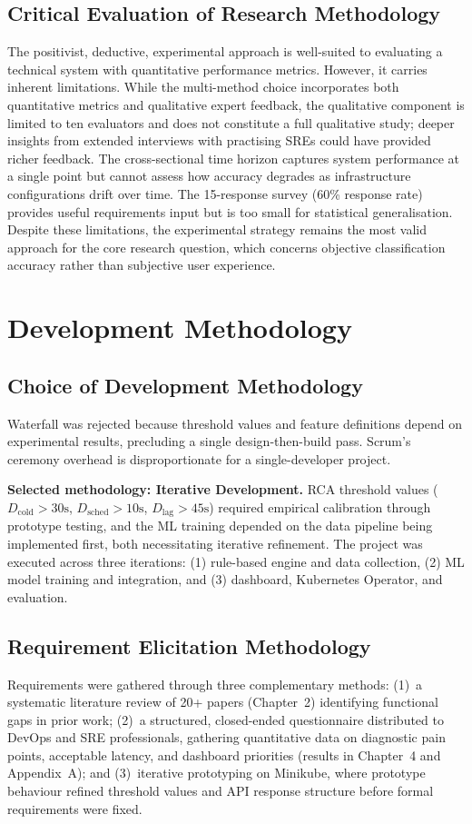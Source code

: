 \subsection{Critical Evaluation of Research Methodology}
The positivist, deductive, experimental approach is well-suited to evaluating a technical system with quantitative performance metrics. However, it carries inherent limitations. While the multi-method choice incorporates both quantitative metrics and qualitative expert feedback, the qualitative component is limited to ten evaluators and does not constitute a full qualitative study; deeper insights from extended interviews with practising SREs could have provided richer feedback. The cross-sectional time horizon captures system performance at a single point but cannot assess how accuracy degrades as infrastructure configurations drift over time. The 15-response survey (60\% response rate) provides useful requirements input but is too small for statistical generalisation. Despite these limitations, the experimental strategy remains the most valid approach for the core research question, which concerns objective classification accuracy rather than subjective user experience.

\section{Development Methodology}

\subsection{Choice of Development Methodology}
Waterfall was rejected because threshold values and feature definitions depend on experimental results, precluding a single design-then-build pass. Scrum's ceremony overhead is disproportionate for a single-developer project.

\textbf{Selected methodology: Iterative Development.} RCA threshold values ($D_{\text{cold}} > 30\text{s}$, $D_{\text{sched}} > 10\text{s}$, $D_{\text{lag}} > 45\text{s}$) required empirical calibration through prototype testing, and the ML training depended on the data pipeline being implemented first, both necessitating iterative refinement. The project was executed across three iterations: (1) rule-based engine and data collection, (2) ML model training and integration, and (3) dashboard, Kubernetes Operator, and evaluation.

\subsection{Requirement Elicitation Methodology}
Requirements were gathered through three complementary methods: (1)~a systematic literature review of 20+ papers (Chapter~2) identifying functional gaps in prior work; (2)~a structured, closed-ended questionnaire distributed to DevOps and SRE professionals, gathering quantitative data on diagnostic pain points, acceptable latency, and dashboard priorities (results in Chapter~4 and Appendix~A); and (3)~iterative prototyping on Minikube, where prototype behaviour refined threshold values and API response structure before formal requirements were fixed.

